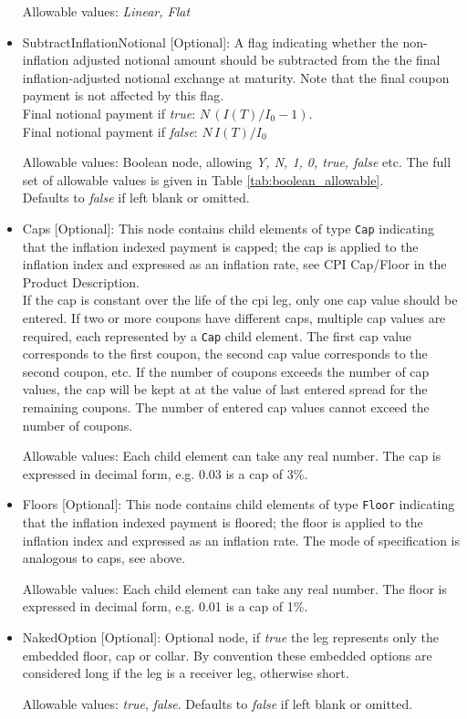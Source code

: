 \begin{itemize}
Allowable values:  \emph{Linear, Flat} 

\item SubtractInflationNotional [Optional]: A flag indicating whether
  the non-inflation adjusted notional amount should be subtracted from
  the the final inflation-adjusted notional exchange at maturity.
  Note that the final coupon payment is not affected by this flag. \\ 
Final notional payment if \emph{true}: $N \,(I(T)/I_0-1)$. \\ 
Final notional payment if  \emph{false}: $N \,I(T)/I_0$ 

Allowable values: Boolean node, allowing \emph{Y, N, 1, 0, true, false} etc. The full set of allowable values is given in Table \ref{tab:boolean_allowable}.
\\Defaults to \emph{false}  if left blank or omitted.

\item Caps [Optional]: This node contains child elements of type
  \lstinline!Cap! indicating that the inflation indexed payment is
  capped; the cap is applied to the inflation index and expressed as
  an inflation rate, see CPI Cap/Floor in the Product Description. \\
  If the cap is constant over the life of the 
cpi leg, only one cap value should
be entered. If two or more coupons have different caps, multiple cap values
are required, each represented by a \lstinline!Cap! child element. The first cap value
corresponds to the first coupon, the second cap value corresponds to the
second coupon, etc. If the number of coupons exceeds the number of cap
values, the cap will be kept at at the value of last entered spread for the
remaining coupons. The number of entered cap values cannot exceed the
number of coupons.

Allowable values: Each child element can take any real number. The cap is
expressed in decimal form, e.g. 0.03 is a cap of 3\%.

\item Floors [Optional]: This node contains child elements of type
  \lstinline!Floor! indicating that the inflation indexed payment is
  floored; the floor is applied to the inflation index and expressed as
  an inflation rate. The mode of specification is analogous to caps, see
  above.

Allowable values: Each child element can take any real number. The floor is
expressed in decimal form, e.g. 0.01 is a cap of 1\%.

\item NakedOption [Optional]: Optional node, if \emph{true} the leg represents only the embedded floor, cap or collar. 
By convention these embedded options are considered long if the leg is a receiver leg, otherwise short. 
 
 Allowable values:  \emph{true}, \emph{false}. Defaults to \emph{false} if left blank or omitted.
 
\end{itemize} 

